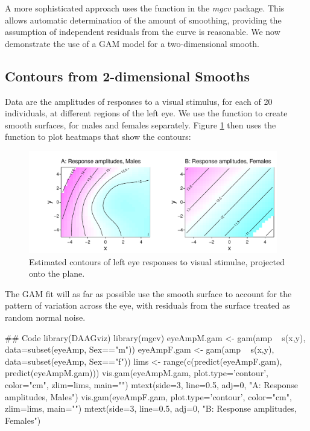 A more sophisticated approach uses the  function
in the {\em mgcv} package.  This allows automatic determination of the
amount of smoothing, providing the assumption of independent residuals
from the curve is reasonable.  We now demonstrate the use of a GAM
model for a two-dimensional smooth.

\subsection{Contours from 2-dimensional Smooths}
Data are the amplitudes of responses to a visual stimulus, for each of
20 individuals, at different regions of the left eye.  We use the
function  to create smooth
surfaces, for males and females separately. Figure \ref{fig:visAmp}
then uses the function  to plot heatmaps that show the
contours:
\begin{fullwidth}
\begin{figure}
\begin{Schunk}


\centerline{\includegraphics[width=0.97\textwidth]{figs/12-plotVIS-1} }

\end{Schunk}
\caption{Estimated contours of left eye responses to visual stimulae,
projected onto the plane.\label{fig:visAmp}}
\end{figure}
\end{fullwidth}
\enlargethispage{12pt}

The GAM fit will as far as possible use the smooth surface
to account for the pattern of variation across the eye, with
residuals from the surface treated as random normal noise.
\vspace*{24pt}

\begin{fullwidth}

\begin{Schunk}
\begin{Sinput}
## Code
library(DAAGviz)
library(mgcv)
eyeAmpM.gam <- gam(amp ~ s(x,y), data=subset(eyeAmp, Sex=="m"))
eyeAmpF.gam <- gam(amp ~ s(x,y), data=subset(eyeAmp, Sex=="f"))
lims <- range(c(predict(eyeAmpF.gam), predict(eyeAmpM.gam)))
vis.gam(eyeAmpM.gam, plot.type='contour', color="cm", zlim=lims, main="")
mtext(side=3, line=0.5, adj=0, "A: Response amplitudes, Males")
vis.gam(eyeAmpF.gam, plot.type='contour', color="cm", zlim=lims, main="")
mtext(side=3, line=0.5, adj=0, "B: Response amplitudes, Females")
\end{Sinput}
\end{Schunk}

\end{fullwidth}


